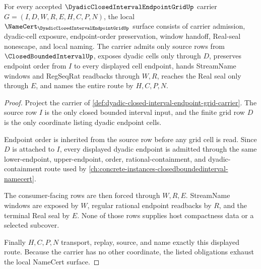 \begin{theorem}
\label{thm:dyadic-closed-interval-endpoint-grid-obligations}
For every accepted $\DyadicClosedIntervalEndpointGridUp$ carrier $G=(I,D,W,R,E,H,C,P,N)$, the local $\NameCert_{\DyadicClosedIntervalEndpointGridUp}$ surface consists of carrier admission, dyadic-cell exposure, endpoint-order preservation, window handoff, Real-seal nonescape, and local naming. The carrier admits only source rows from $\ClosedBoundedIntervalUp$, exposes dyadic cells only through $D$, preserves endpoint order from $I$ to every displayed cell endpoint, hands StreamName windows and RegSeqRat readbacks through $W,R$, reaches the Real seal only through $E$, and names the entire route by $H,C,P,N$.
\end{theorem}
\begin{proof}
Project the carrier of \autoref{def:dyadic-closed-interval-endpoint-grid-carrier}. The source row $I$ is the only closed bounded interval input, and the finite grid row $D$ is the only coordinate listing dyadic endpoint cells.

Endpoint order is inherited from the source row before any grid cell is read. Since $D$ is attached to $I$, every displayed dyadic endpoint is admitted through the same lower-endpoint, upper-endpoint, order, rational-containment, and dyadic-containment route used by \autoref{ch:concrete-instances-closedboundedinterval-namecert}.

The consumer-facing rows are then forced through $W,R,E$. StreamName windows are exposed by $W$, regular rational endpoint readbacks by $R$, and the terminal Real seal by $E$. None of those rows supplies host compactness data or a selected subcover.

Finally $H,C,P,N$ transport, replay, source, and name exactly this displayed route. Because the carrier has no other coordinate, the listed obligations exhaust the local NameCert surface.
\end{proof}

